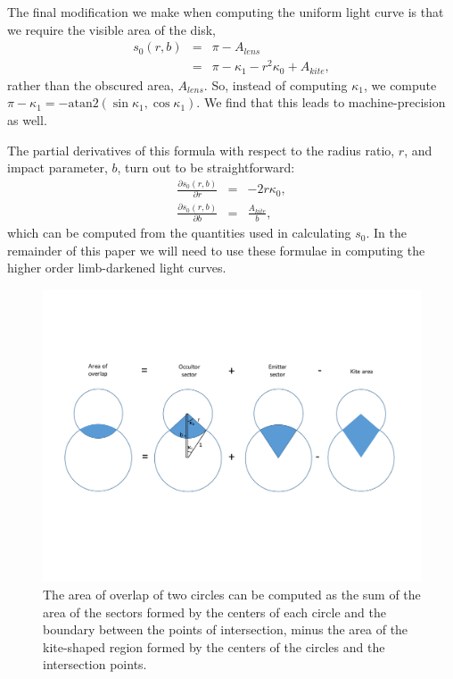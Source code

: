 \documentclass[modern]{aastex61}
\begin{document}
The final modification we make when computing the uniform light
curve is that we require the visible area of the disk, 
\begin{eqnarray}
s_0(r,b) &=& \pi-A_{lens}\\
&=&\pi -\kappa_1 - r^2\kappa_0 + A_{kite},
\end{eqnarray}
rather than the obscured area, $A_{lens}$.  So, instead of computing $\kappa_1$,
we compute $\pi-\kappa_1 = -\mathrm{atan2}(\sin{\kappa_1},\cos{\kappa_1})$.
We find that this leads to machine-precision as well.

The partial derivatives of this formula with respect to the radius
ratio, $r$, and impact parameter, $b$, turn out to be straightforward:
\begin{eqnarray}
\frac{\partial s_0(r,b)}{\partial r} &=& -2r \kappa_0,\\
\frac{\partial s_0(r,b)}{\partial b} &=& \frac{A_{kite}}{b},
\end{eqnarray}
which can be computed from the quantities used in calculating $s_0$.
In the remainder of this paper we will need to use these formulae in computing
the higher order limb-darkened light curves.

\begin{figure}
    \begin{centering}
    \includegraphics[width=\linewidth]{Circle_overlap_area.pdf}
    \caption{The area of overlap of two circles can be computed as the sum of
    the area of the sectors formed by the centers of each circle and the
    boundary between the points of intersection, minus the area of the kite-shaped
    region formed by the centers of the circles and the intersection points.}\label{fig:circle_overlap}
    \end{centering} 
\end{figure}
\end{document}
